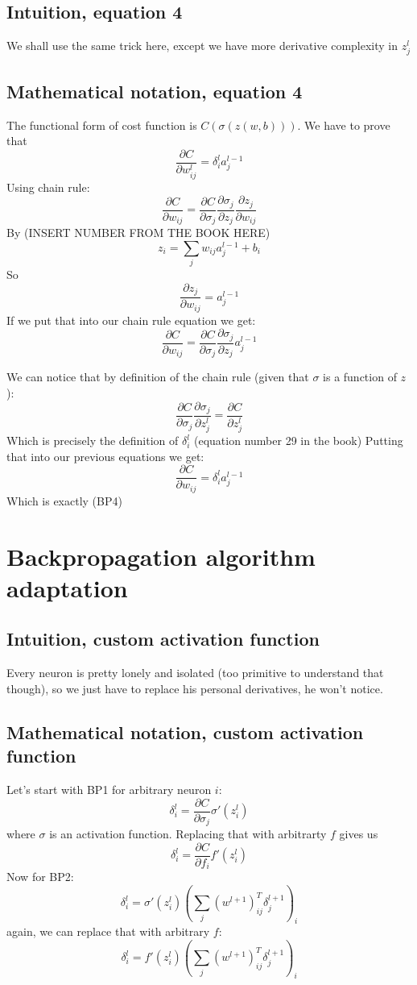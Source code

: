 \documentclass{article}
\begin{document}
\subsection{Intuition, equation 4}
We shall use the same trick here, except we have more derivative complexity in $z^l_j$
\subsection{Mathematical notation, equation 4}
The functional form of cost function is $C(\sigma(z(w,b)))$.
We have to prove that 
$$\frac{\partial C}{\partial w^l_{ij}} = \delta^l_i a^{l-1}_j$$
Using chain rule:
$$\frac{\partial C}{\partial w_{ij}} = \frac{\partial C}{\partial \sigma_j} \frac{\partial \sigma_j}{\partial z_j} \frac{\partial z_j}{\partial w_{ij}}$$
By (INSERT NUMBER FROM THE BOOK HERE)
$$z_i = \sum_jw_{ij}a^{l-1}_j + b_i$$
So
$$\frac{\partial z_j}{\partial w_{ij}} = a^{l-1}_j$$
If we put that into our chain rule equation we get:
$$\frac{\partial C}{\partial w_{ij}} = \frac{\partial C}{\partial \sigma_j} \frac{\partial \sigma_j}{\partial z_j} a^{l-1}_j$$

We can notice that by definition of the chain rule (given that $\sigma$ is a function of $z$):
$$\frac{\partial C}{\partial \sigma_j} \frac{\partial \sigma_j}{\partial z^l_j} = \frac{\partial C}{\partial z^l_j}$$
Which is precisely the definition of $\delta^l_i$ (equation number 29 in the book)
Putting that into our previous equations we get:
$$\frac{\partial C}{\partial w_{ij}} = \delta^l_i a^{l-1}_j$$
Which is exactly (BP4)

\section{Backpropagation algorithm adaptation}
\subsection{Intuition, custom activation function}
Every neuron is pretty lonely and isolated (too primitive to understand that though), so we just have to replace his personal derivatives, he won't notice.
\subsection{Mathematical notation, custom activation function}
Let's start with BP1 for arbitrary neuron $i$:
$$\delta^l_i = \frac{\partial C}{\partial \sigma_j} \sigma'(z^l_i)$$
where $\sigma$ is an activation function. Replacing that with arbitrarty $f$ gives us
$$\delta^l_i = \frac{\partial C}{\partial f_i} f'(z^l_i)$$
Now for BP2:
$$\delta^l_i = \sigma'(z_i^l) (\sum_j(w^{l+1})^T_{ij} \delta^{l+1}_j)_i$$
again, we can replace that with arbitrary $f$:
$$\delta^l_i = f'(z_i^l) (\sum_j(w^{l+1})^T_{ij} \delta^{l+1}_j)_i$$
\end{document}

